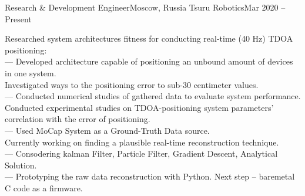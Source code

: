\resumeSubheading
  {Research \& Development Engineer}{Moscow, Russia}
  {Tsuru Robotics}{Mar 2020 -- Present}
  \begin{itemize}[leftmargin=0in, label={}]
    \small{\item{
      {Researched system architectures fitness for conducting real-time (40 Hz) TDOA positioning:}\\
      {— Developed architecture capable of positioning an unbound amount of devices in one system.}\\
      {Investigated ways to the positioning error to sub-30 centimeter values.}\\
      {— Conducted numerical studies of gathered data to evaluate system performance.}\\
      {Conducted experimental studies on TDOA-positioning system parameters' correlation with the error of positioning.}\\
      {— Used MoCap System as a Ground-Truth Data source.}\\
      {Currently working on finding a plausible real-time reconstruction technique.}\\
      {— Consodering kalman Filter, Particle Filter, Gradient Descent, Analytical Solution.}\\
      {— Prototyping the raw data reconstruction with Python. Next step -- baremetal C code as a firmware.}\\
    }}
   \end{itemize}